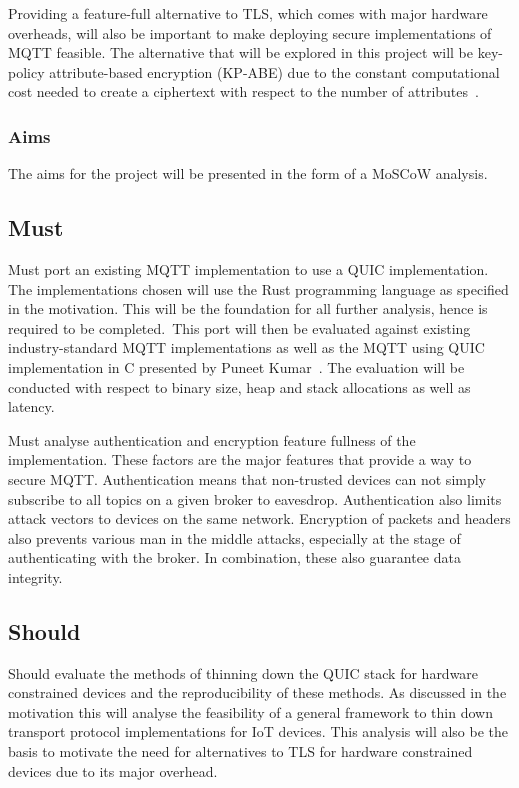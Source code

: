 \documentclass[11pt]{article}
\begin{document}
Providing a feature-full alternative to TLS, which comes with major hardware overheads, will also be important to make deploying secure implementations of MQTT feasible.
The alternative that will be explored in this project will be key-policy attribute-based encryption (KP-ABE) due to the constant computational cost needed to create a ciphertext with respect to the number of attributes~\cite{wang_key-policy_2012}.

\subsubsection{Aims}\label{aims}

The aims for the project will be presented in the form of a MoSCoW analysis.

\subsection*{Must}

Must port an existing MQTT implementation to use a QUIC implementation.
The implementations chosen will use the Rust programming language as specified in the motivation.
This will be the foundation for all further analysis, hence is required to be completed.\
This port will then be evaluated against existing industry-standard MQTT implementations as well as the MQTT using QUIC implementation in C presented by Puneet Kumar~\cite{kumar_implementation_2019}.
The evaluation will be conducted with respect to binary size, heap and stack allocations as well as latency.

Must analyse authentication and encryption feature fullness of the implementation.
These factors are the major features that provide a way to secure MQTT.
Authentication means that non-trusted devices can not simply subscribe to all topics on a given broker to eavesdrop.
Authentication also limits attack vectors to devices on the same network.
Encryption of packets and headers also prevents various man in the middle attacks, especially at the stage of authenticating with the broker.
In combination, these also guarantee data integrity.

\subsection*{Should}

Should evaluate the methods of thinning down the QUIC stack for hardware constrained devices and the reproducibility of these methods.
As discussed in the motivation this will analyse the feasibility of a general framework to thin down transport protocol implementations for IoT devices.
This analysis will also be the basis to motivate the need for alternatives to TLS for hardware constrained devices due to its major overhead.
\end{document}
